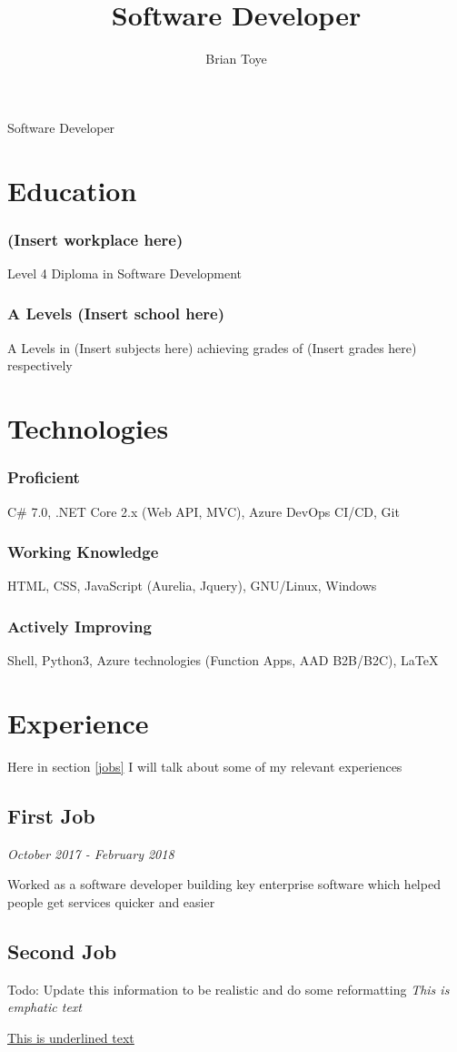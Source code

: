 \documentclass{article}
\author{Brian Toye}
\title{Software Developer}
\renewcommand{\maketitle}{
\begin{center}
{\huge\bfseries
\theauthor}

\vspace{.25em}

Software Developer
\end{center}
}
\begin{document}
\maketitle

\section{Education}

\subsubsection{(Insert workplace here)}
Level 4 Diploma in Software Development

\subsubsection{A Levels (Insert school here)}
A Levels in (Insert subjects here) achieving grades of (Insert grades here) respectively

\section{Technologies}

\subsubsection{Proficient}
C\# 7.0, .NET Core 2.x (Web API, MVC), Azure DevOps CI/CD, Git

\subsubsection{Working Knowledge}
HTML, CSS, JavaScript (Aurelia, Jquery), GNU/Linux, Windows

\subsubsection{Actively Improving}
Shell, Python3, Azure technologies (Function Apps, AAD B2B/B2C), {\LaTeX}

\section{Experience\label{jobs}}

Here in section \ref{jobs} I will talk about some of my relevant experiences

\subsection{First Job}

\textit {October 2017 - February 2018}

Worked as a software developer building key enterprise software which helped people get services quicker and easier

\subsection{Second Job}
Todo: Update this information to be realistic and do some reformatting
\emph{This is emphatic text}

\underline{This is underlined text}
\end{document}
